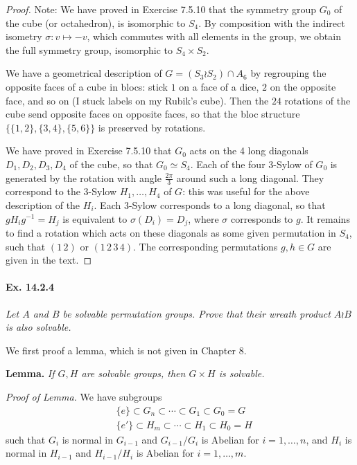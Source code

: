 \documentclass[11pt,a4paper]{article}
\begin{document}
\begin{proof}
Note: We have proved in Exercise 7.5.10 that the symmetry group $G_0$ of the cube (or octahedron), is isomorphic to $S_4$. By composition with the indirect isometry $\sigma : v\mapsto -v$, which commutes with all elements in the group, we obtain the full symmetry group, isomorphic to $S_4 \times S_2$.

We have a geometrical description of $G = (S_3\wr S_2) \cap A_6$ by regrouping the opposite faces of a cube in blocs: stick $1$ on a face of a dice, $2$ on the opposite face, and so on (I stuck labels on my Rubik's cube). Then the $24$ rotations of the cube send opposite faces on opposite faces, so that the bloc structure $\{\{1,2\},\{3,4\},\{5,6\}\}$ is preserved by rotations.

We have proved in Exercise 7.5.10 that $G_0$ acts on the 4 long diagonals $D_1,D_2,D_3,D_4$ of the cube, so that $G_0 \simeq S_4$. Each of the four $3$-Sylow of $G_0$ is generated by the rotation with angle $\frac{2\pi}{3}$ around such a  long diagonal. They correspond to the $3$-Sylow $H_1,\ldots,H_4$ of $G$: this was useful for the above description of the $H_i$. Each $3$-Sylow corresponds to a long diagonal, so that $gH_ig^{-1} = H_j$ is equivalent to $\sigma(D_i) = D_j$, where $\sigma$ corresponds to $g$. It remains to find a rotation which acts on these diagonals as some given permutation in $S_4$, such that $(1\,2)$ or $(1\,2\,3\,4)$. The corresponding permutations $g,h \in G $ are given in the text.

\end{proof}

\paragraph{Ex. 14.2.4}
{ \it
Let $A$ and $B$ be solvable permutation groups. Prove that their wreath product $A\wr B$ is also solvable.
}

\medskip

We first proof a lemma, which is not given in Chapter 8.

\medskip

{\bf Lemma.} {\it If $G,H$ are solvable groups, then $G \times H$ is solvable.}

\medskip

{\it Proof of Lemma.} We have subgroups 
\begin{align*}
&\{e\} \subset G_n \subset \cdots \subset G_1 \subset G_0 = G\\
&\{e'\} \subset H_m \subset \cdots \subset H_1 \subset H_0 = H
\end{align*}
such that $G_i$ is normal in $G_{i-1}$ and $G_{i-1}/G_i$ is Abelian for $i=1,\ldots,n$, and $H_i$ is normal in $H_{i-1}$ and $H_{i-1}/H_i$ is Abelian for $i=1,\ldots,m$.
\end{document}

